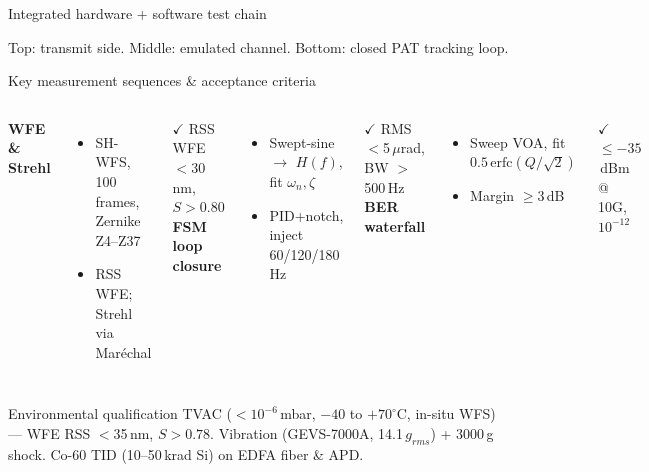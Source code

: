 \documentclass{KAIST-slide}
\newcommand{\si}{\item[\textcolor{islcorange}{\ding{167}}]}    %
\begin{document}
\begin{frame}{Integrated hardware + software test chain}
\begin{center}
    \end{center}
    \footnotesize Top: transmit side. Middle: emulated channel. Bottom: closed PAT tracking loop.
\end{frame}

\begin{frame}{Key measurement sequences \& acceptance criteria}
    \footnotesize
    \begin{columns}[T]
        \textbf{WFE \& Strehl}
        \begin{itemize}\scriptsize
            \si SH-WFS, 100 frames, Zernike Z4--Z37
            \si RSS WFE; Strehl via Mar\'echal
        \end{itemize}
        \textcolor{islcteal}{$\checkmark$ RSS WFE $<$30\,nm, $S>0.80$}
        \textbf{FSM loop closure}
        \begin{itemize}\scriptsize
            \si Swept-sine $\to$ $H(f)$, fit $\omega_n,\zeta$
            \si PID+notch, inject 60/120/180\,Hz
        \end{itemize}
        \textcolor{islcteal}{$\checkmark$ RMS $<$5\,$\mu$rad, BW $>$500\,Hz}
        \textbf{BER waterfall}
        \begin{itemize}\scriptsize
            \si Sweep VOA, fit $0.5\,\mathrm{erfc}(Q/\sqrt2)$
            \si Margin $\ge3$\,dB
        \end{itemize}
        \textcolor{islcteal}{$\checkmark$ $\le-35$\,dBm @ 10G, $10^{-12}$}
    \end{columns}
    \vspace{2mm}
    \begin{block}{Environmental qualification}
    \scriptsize TVAC ($<10^{-6}$\,mbar, $-40$ to $+70^\circ$C, in-situ WFS) --- WFE RSS $<$35\,nm, $S>0.78$. \quad
    Vibration (GEVS-7000A, 14.1\,$g_{rms}$) + 3000\,g shock. \quad Co-60 TID (10--50\,krad Si) on EDFA fiber \& APD.
    \end{block}
\end{frame}
\end{document}
